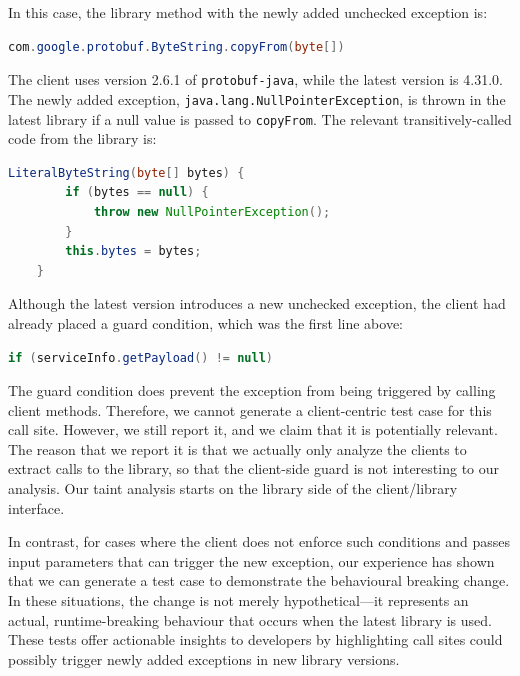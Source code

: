 In this case, the library method with the newly added unchecked exception is:

\begin{lstlisting}[language=Java]
    com.google.protobuf.ByteString.copyFrom(byte[])
\end{lstlisting}

The client uses version 2.6.1 of \texttt{protobuf-java}, while the latest version is 4.31.0. The newly added exception, \texttt{java.lang.NullPointerException}, is thrown in the latest library if a null value is passed to \texttt{copyFrom}. The relevant transitively-called code from the library is:

\begin{lstlisting}[language=Java]
    LiteralByteString(byte[] bytes) {
        if (bytes == null) {
            throw new NullPointerException();
        }
        this.bytes = bytes;
    }
\end{lstlisting}

Although the latest version introduces a new unchecked exception, the client had already placed a guard condition, which was the first line above:

\begin{lstlisting}[language=Java]
  if (serviceInfo.getPayload() != null)
\end{lstlisting}

The guard condition does prevent the exception from being triggered by calling client methods. Therefore, we cannot generate a client-centric test case for this call site. However, we still report it, and we claim that it is potentially relevant. The reason that we report it is that we actually only analyze the clients to extract calls to the library, so that the client-side guard is not interesting to our analysis. Our taint analysis starts on the library side of the client/library interface.

In contrast, for cases where the client does not enforce such conditions and passes input parameters that can trigger the new exception, our experience has shown that we can generate a test case to demonstrate the behavioural breaking change. In these situations, the change is not merely hypothetical—it represents an actual, runtime-breaking behaviour that occurs when the latest library is used. These tests offer actionable insights to developers by highlighting call sites could possibly trigger newly added exceptions in new library versions.


